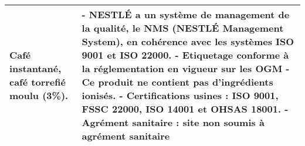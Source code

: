 \begin{tabular}{p{7cm}p{7cm}}
                                                                                                                                                                                                                                                                                                                                                                                                                                   Café instantané, café torrefié moulu (3\%). &                                                                                                                                                                                                                                                                                                                                                                                                                                                                                                                                                                                                                                                                                                                                                                                                                                                                                                                                                                                                                         - NESTLÉ a un système de management de la qualité, le NMS (NESTLÉ  \newline Management System), en cohérence avec les systèmes ISO 9001 et ISO 22000. \newline - Etiquetage conforme à la réglementation en vigueur sur les OGM  \newline - Ce produit ne contient pas d'ingrédients ionisés. \newline - Certifications usines :  ISO 9001, FSSC 22000, ISO 14001 et OHSAS 18001. \newline - Agrément sanitaire : site non soumis à agrément sanitaire \\
\bottomrule
\end{tabular}

